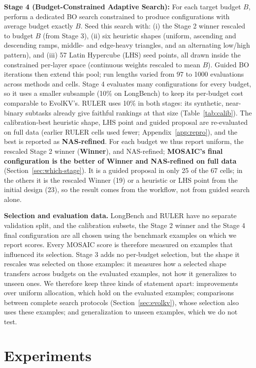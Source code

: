 \documentclass[11pt]{article}
\begin{document}
\textbf{Stage 4 (Budget-Constrained Adaptive Search):} For each target budget $B$, perform a dedicated BO search constrained to produce configurations with average budget exactly $B$. Seed this search with: (i) the Stage 2 winner rescaled to budget $B$ (from Stage 3), (ii) six heuristic shapes (uniform, ascending and descending ramps, middle- and edge-heavy triangles, and an alternating low/high pattern), and (iii) 57 Latin Hypercube (LHS) seed points, all drawn inside the constrained per-layer space (continuous weights rescaled to mean $B$). Guided BO iterations then extend this pool; run lengths varied from 97 to 1000 evaluations across methods and cells. Stage 4 evaluates many configurations for every budget, so it uses a smaller subsample (10\% on LongBench) to keep its per-budget cost comparable to EvolKV's. RULER uses 10\% in both stages: its synthetic, near-binary subtasks already give faithful rankings at that size (Table~\ref{tab:calib}). The calibration-best heuristic shape, LHS point and guided proposal are re-evaluated on full data (earlier RULER cells used fewer; Appendix~\ref{app:repro}), and the best is reported as \textbf{NAS-refined}. For each budget we thus report uniform, the rescaled Stage 2 winner (\textbf{Winner}), and NAS-refined; \textbf{MOSAIC's final configuration is the better of Winner and NAS-refined on full data} (Section~\ref{sec:which-stage}). It is a guided proposal in only 25 of the 67 cells; in the others it is the rescaled Winner (19) or a heuristic or LHS point from the initial design (23), so the result comes from the workflow, not from guided search alone.

\textbf{Selection and evaluation data.} LongBench and RULER have no separate validation split, and the calibration subsets, the Stage 2 winner and the Stage 4 final configuration are all chosen using the benchmark examples on which we report scores. Every MOSAIC score is therefore measured on examples that influenced its selection. Stage 3 adds no per-budget selection, but the shape it rescales was selected on those examples: it measures how a selected shape transfers across budgets on the evaluated examples, not how it generalizes to unseen ones. We therefore keep three kinds of statement apart: improvements over uniform allocation, which hold on the evaluated examples; comparisons between complete search protocols (Section~\ref{sec:evolkv}), whose selection also uses these examples; and generalization to unseen examples, which we do not test.


\section{Experiments}
\end{document}
